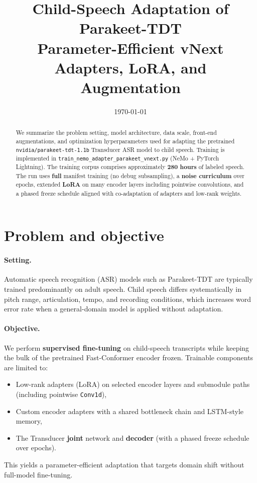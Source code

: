 \documentclass[11pt,a4paper]{article}
\title{Child-Speech Adaptation of Parakeet-TDT\\Parameter-Efficient vNext Adapters, LoRA, and Augmentation}
\author{}
\date{\today}
\begin{document}
\maketitle

\begin{abstract}
We summarize the problem setting, model architecture, data scale, front-end augmentations, and optimization hyperparameters used for adapting the pretrained \texttt{nvidia/parakeet-tdt-1.1b} Transducer ASR model to child speech. Training is implemented in \texttt{train\_nemo\_adapter\_parakeet\_vnext.py} (NeMo + PyTorch Lightning). The training corpus comprises approximately \textbf{280 hours} of labeled speech. The run uses \textbf{full} manifest training (no debug subsampling), a \textbf{noise curriculum} over epochs, extended \textbf{LoRA} on many encoder layers including pointwise convolutions, and a phased freeze schedule aligned with co-adaptation of adapters and low-rank weights.
\end{abstract}

\section{Problem and objective}
\label{sec:problem}

\paragraph{Setting.}
Automatic speech recognition (ASR) models such as Parakeet-TDT are typically trained predominantly on adult speech. Child speech differs systematically in pitch range, articulation, tempo, and recording conditions, which increases word error rate when a general-domain model is applied without adaptation.

\paragraph{Objective.}
We perform \textbf{supervised fine-tuning} on child-speech transcripts while keeping the bulk of the pretrained Fast-Conformer encoder frozen. Trainable components are limited to:
\begin{itemize}
  \item Low-rank adapters (LoRA) on selected encoder layers and submodule paths (including pointwise \texttt{Conv1d}),
  \item Custom encoder adapters with a shared bottleneck chain and LSTM-style memory,
  \item The Transducer \textbf{joint} network and \textbf{decoder} (with a phased freeze schedule over epochs).
\end{itemize}
This yields a parameter-efficient adaptation that targets domain shift without full-model fine-tuning.
\end{document}
